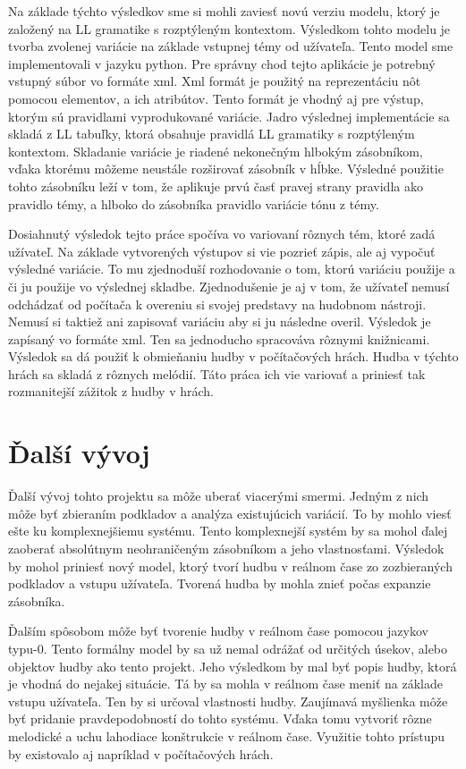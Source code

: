 Na základe týchto výsledkov sme si mohli zaviesť novú verziu modelu, ktorý je založený na LL gramatike s rozptýleným kontextom. Výsledkom tohto modelu je tvorba zvolenej variácie na základe vstupnej témy od užívateľa. Tento model sme implementovali v jazyku python. Pre správny chod tejto aplikácie je potrebný vstupný súbor vo formáte xml. Xml formát je použitý na reprezentáciu nôt pomocou elementov, a ich atribútov. Tento formát je vhodný aj pre výstup, ktorým sú pravidlami vyprodukované variácie. Jadro výslednej implementácie sa skladá z LL tabuľky, ktorá obsahuje pravidlá LL gramatiky s rozptýleným kontextom. Skladanie variácie je riadené nekonečným hlbokým zásobníkom, vďaka ktorému môžeme neustále rozširovať zásobník v hĺbke. Výsledné použitie tohto zásobníku leží v tom, že aplikuje prvú časť pravej strany pravidla ako pravidlo témy, a hlboko do zásobníka pravidlo variácie tónu z témy.

Dosiahnutý výsledok tejto práce spočíva vo variovaní rôznych tém, ktoré zadá užívateľ. Na základe vytvorených výstupov si vie pozrieť zápis, ale aj vypočuť výsledné variácie. To mu zjednoduší rozhodovanie o tom, ktorú variáciu použije a či ju použije vo výslednej skladbe. Zjednodušenie je aj v tom, že užívateľ nemusí odchádzať od počítača k overeniu si svojej predstavy na hudobnom nástroji. Nemusí si taktiež ani zapisovať variáciu aby si ju následne overil. Výsledok je zapísaný vo formáte xml. Ten sa jednoducho spracováva rôznymi knižnicami. Výsledok sa dá použiť k obmieňaniu hudby v počítačových hrách. Hudba v týchto hrách sa skladá z rôznych melódií. Táto práca ich vie variovať a priniesť tak rozmanitejší zážitok z hudby v hrách.

\section{Ďalší vývoj}
Ďalší vývoj tohto projektu sa môže uberať viacerými smermi. Jedným z nich môže byť zbieraním podkladov a analýza existujúcich variácií. To by mohlo viesť ešte ku komplexnejšiemu systému. Tento komplexnejší systém by sa mohol ďalej zaoberať absolútnym neohraničeným zásobníkom a jeho vlastnosťami. Výsledok by mohol priniesť nový model, ktorý tvorí hudbu v reálnom čase zo zozbieraných podkladov a vstupu užívateľa. Tvorená hudba by mohla znieť počas expanzie zásobníka.

Ďalším spôsobom môže byť tvorenie hudby v reálnom čase pomocou jazykov typu-0. Tento formálny model by sa už nemal odrážať od určitých úsekov, alebo objektov hudby ako tento projekt. Jeho výsledkom by mal byť popis hudby, ktorá je vhodná do nejakej situácie. Tá by sa mohla v reálnom čase meniť na základe vstupu užívateľa. Ten by si určoval vlastnosti hudby. Zaujímavá myšlienka môže byť pridanie pravdepodobností do tohto systému. Vďaka tomu vytvoriť rôzne melodické a uchu lahodiace konštrukcie v reálnom čase. Využitie tohto prístupu by existovalo aj napríklad v počítačových hrách. 

